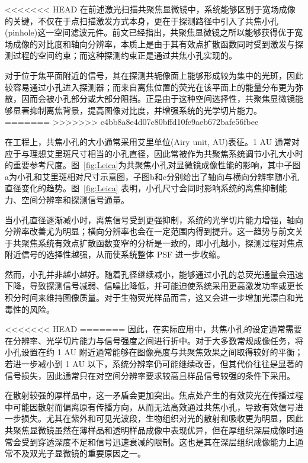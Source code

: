 <<<<<<< HEAD
在前述激光扫描共聚焦显微镜中，系统能够区别于宽场成像的关键，不仅在于点扫描激发方式本身，更在于探测路径中引入了共焦小孔(pinhole)这一空间滤波元件。前文已经指出，共聚焦显微镜之所以能够获得优于宽场成像的对比度和轴向分辨率，本质上是由于其有效点扩散函数同时受到激发与探测过程的空间约束；而这种探测约束正是通过共焦小孔实现的。

对于位于焦平面附近的信号，其在探测共轭像面上能够形成较为集中的光斑，因此较容易通过小孔进入探测器；而来自离焦位置的荧光在该平面上的能量分布更为弥散，因而会被小孔部分或大部分阻挡。正是由于这种空间选择性，共聚焦显微镜能够显著抑制离焦背景，提高图像对比度，并增强系统的光学切片能力。
=======
>>>>>>> c4bb8a8e4d07c80bffd10fe9aeb672bafe56fbee

在工程上，共焦小孔的大小通常采用艾里单位(Airy unit, AU)表征。1 AU 通常对应于与理想艾里斑尺寸相当的小孔直径，因此常被作为共聚焦系统调节小孔大小时的重要参考尺度。图~\ref{fig:Leica}为共聚焦小孔对显微镜成像性能的影响，其中子图a为小孔和艾里斑相对尺寸示意图，子图b和c分别给出了轴向与横向分辨率随小孔直径变化的趋势。图~\ref{fig:Leica} 表明，小孔尺寸会同时影响系统的离焦抑制能力、空间分辨率和探测信号通量。

当小孔直径逐渐减小时，离焦信号受到更强抑制，系统的光学切片能力增强，轴向分辨率改善尤为明显；横向分辨率也会在一定范围内得到提升。这一趋势与前文关于共聚焦系统有效点扩散函数变窄的分析是一致的，即小孔越小，探测过程对焦点附近信号的选择性越强，从而使系统整体 PSF 进一步收缩。

然而，小孔并非越小越好。随着孔径继续减小，能够通过小孔的总荧光通量会迅速下降，导致探测信号减弱、信噪比降低，并可能迫使系统采用更高激发功率或更长积分时间来维持图像质量。对于生物荧光样品而言，这又会进一步增加光漂白和光毒性的风险。

<<<<<<< HEAD
=======
因此，在实际应用中，共焦小孔的设定通常需要在分辨率、光学切片能力与信号强度之间进行折中。对于大多数常规成像任务，将小孔设置在约 1 AU 附近通常能够在图像亮度与共聚焦效果之间取得较好的平衡；若进一步减小到 1 AU 以下，系统分辨率仍可能继续改善，但其代价往往是显著的信号损失，因此通常只在对空间分辨率要求较高且样品信号较强的条件下采用。

在散射较强的厚样品中，这一矛盾会更加突出。焦点处产生的有效荧光在传播过程中可能因散射而偏离原有传播方向，从而无法高效通过共焦小孔，导致有效信号进一步损失。尤其在紫外和可见光波段，生物组织对光的散射和吸收更为明显，因此共聚焦显微镜虽然在薄样品和透明样品成像中表现优异，但在厚组织深层成像时通常会受到穿透深度不足和信号迅速衰减的限制。这也是其在深层组织成像能力上通常不及双光子显微镜的重要原因之一。



